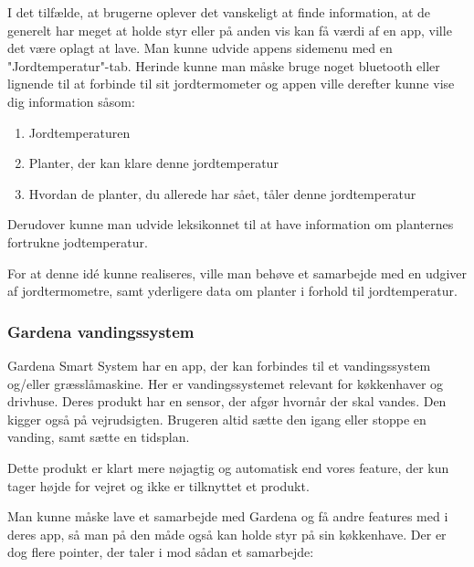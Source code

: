 I det tilfælde, at brugerne oplever det vanskeligt at finde information, at de generelt har meget at holde styr eller på anden vis kan få værdi af en app, ville det være oplagt at lave. Man kunne udvide appens sidemenu med en "Jordtemperatur"-tab. Herinde kunne man måske bruge noget bluetooth eller lignende til at forbinde til sit jordtermometer og appen ville derefter kunne vise dig information såsom:

\begin{enumerate}
    \item{Jordtemperaturen}
    \item{Planter, der kan klare denne jordtemperatur}
    \item{Hvordan de planter, du allerede har sået, tåler denne jordtemperatur}
\end{enumerate}

Derudover kunne man udvide leksikonnet til at have information om planternes fortrukne jodtemperatur.

For at denne idé kunne realiseres, ville man behøve et samarbejde med en udgiver af jordtermometre, samt yderligere data om planter i forhold til jordtemperatur.

\subsubsection*{Gardena vandingssystem}
Gardena Smart System har en app, der kan forbindes til et vandingssystem og/eller græsslåmaskine. Her er vandingssystemet relevant for køkkenhaver og drivhuse. Deres produkt har en sensor, der afgør hvornår der skal vandes. Den kigger også på vejrudsigten. Brugeren altid sætte den igang eller stoppe en vanding, samt sætte en tidsplan.

Dette produkt er klart mere nøjagtig og automatisk end vores feature, der kun tager højde for vejret og ikke er tilknyttet et produkt.

Man kunne måske lave et samarbejde med Gardena og få andre features med i deres app, så man på den måde også kan holde styr på sin køkkenhave. Der er dog flere pointer, der taler i mod sådan et samarbejde:


